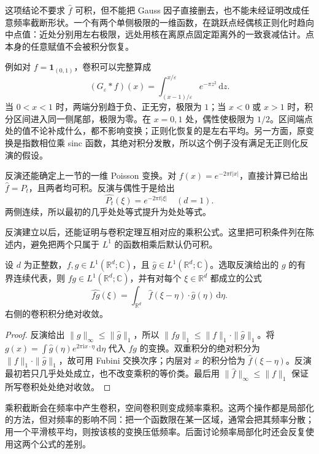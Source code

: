这项结论不要求 \(\widehat f\) 可积，但不能把 Gauss 因子直接删去，也不能未经证明改成任意频率截断形状。一个有两个单侧极限的一维函数，在跳跃点经偶核正则化时趋向中点值：近处分别用左右极限，远处用核在离原点固定距离外的一致衰减估计。点本身的任意赋值不会被积分恢复。

\ProseParagraphBreak

例如对 \(f=\mathbf1_{(0,1)}\)，卷积可以完整算成
\[
 (G_\varepsilon*f)(x)
 =\int_{(x-1)/\varepsilon}^{x/\varepsilon}e^{-\pi z^2}\,\mathrm dz.
\]
当 \(0<x<1\) 时，两端分别趋于负、正无穷，极限为 \(1\)；当 \(x<0\) 或 \(x>1\) 时，积分区间进入同一侧尾部，极限为零。在 \(x=0,1\) 处，偶性使极限为 \(1/2\)。区间端点处的值不论补成什么，都不影响变换；正则化恢复的是左右平均。另一方面，原变换是指数相位乘 sinc 函数，其绝对积分发散，所以这个例子没有满足无正则化反演的假设。

\ProseParagraphBreak

反演还能确定上一节的一维 Poisson 变换。对 \(f(x)=e^{-2\pi t|x|}\)，直接计算已给出 \(\widehat f=P_t\)，且两者均可积。反演与偶性于是给出
\[
 \widehat {P_t}(\xi)=e^{-2\pi t|\xi|}\quad(d=1).
\]
两侧连续，所以最初的几乎处处等式提升为处处等式。

反演建立以后，还能证明与卷积定理互相对应的乘积公式。这里把可积条件列在陈述内，避免把两个只属于 \(L^1\) 的函数相乘后默认仍可积。

\begin{proposition}\label{b2:prop:03-product-transform}
设 \(d\) 为正整数，\(f,g\in L^1(\mathbb R^d;\mathbb C)\)，且 \(\widehat g\in L^1(\mathbb R^d;\mathbb C)\)。选取反演给出的 \(g\) 的有界连续代表，则 \(fg\in L^1(\mathbb R^d;\mathbb C)\)，并有对每个 \(\xi\in\mathbb R^d\) 都成立的公式
\[
 \widehat{fg}(\xi)=\int_{\mathbb R^d}\widehat f(\xi-\eta)\cdot\widehat g(\eta)\,\mathrm d\eta.
\]
右侧的卷积积分绝对收敛。
\end{proposition}
\begin{proof}
反演给出 \(\|g\|_\infty\leq\|\widehat g\|_1\)，所以 \(\|fg\|_1\leq\|f\|_1\cdot\|\widehat g\|_1\)。将 \(g(x)=\int\widehat g(\eta)e^{2\pi\mathrm i x\cdot\eta}\,\mathrm d\eta\) 代入 \(fg\) 的变换。双重积分的绝对积分为 \(\|f\|_1\cdot\|\widehat g\|_1\)，故可用 Fubini 交换次序；内层对 \(x\) 的积分恰为 \(\widehat f(\xi-\eta)\)。反演最初若只几乎处处成立，也不改变乘积的等价类。最后用 \(\|\widehat f\|_\infty\leq\|f\|_1\) 保证所写卷积处处绝对收敛。
\end{proof}

乘积截断会在频率中产生卷积，空间卷积则变成频率乘积。这两个操作都是局部化的方法，但对频率的影响不同：把一个函数限在某一区域，通常会把其频率分散；用一个平滑核平均，则按该核的变换压低频率。后面讨论频率局部化时还会反复使用这两个公式的差别。

